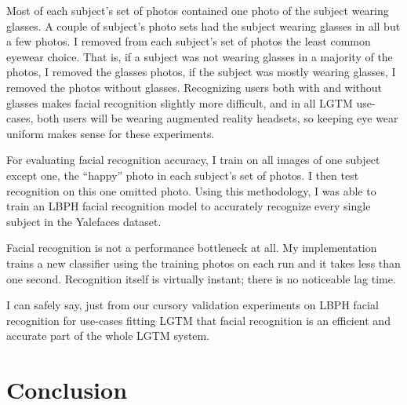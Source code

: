 \documentclass[12pt]{report}
\begin{document}
Most of each subject's set of photos contained one photo of the subject wearing glasses. A couple of subject's photo sets had the subject wearing glasses in all but a few photos. I removed from each subject's set of photos the least common eyewear choice. That is, if a subject was not wearing glasses in a majority of the photos, I removed the glasses photos, if the subject was mostly wearing glasses, I removed the photos without glasses. Recognizing users both with and without glasses makes facial recognition slightly more difficult, and in all LGTM use-cases, both users will be wearing augmented reality headsets, so keeping eye wear uniform makes sense for these experiments. \par

For evaluating facial recognition accuracy, I train on all images of one subject except one, the ``happy'' photo in each subject's set of photos. I then test recognition on this one omitted photo. Using this methodology, I was able to train an LBPH facial recognition model to accurately recognize every single subject in the Yalefaces dataset. \par

Facial recognition is not a performance bottleneck at all. My implementation trains a new classifier using the training photos on each run and it takes less than one second. Recognition itself is virtually instant; there is no noticeable lag time. \par

I can safely say, just from our cursory validation experiments on LBPH facial recognition for use-cases fitting LGTM that facial recognition is an efficient and accurate part of the whole LGTM system. \par



\chapter{Conclusion}
\end{document}
